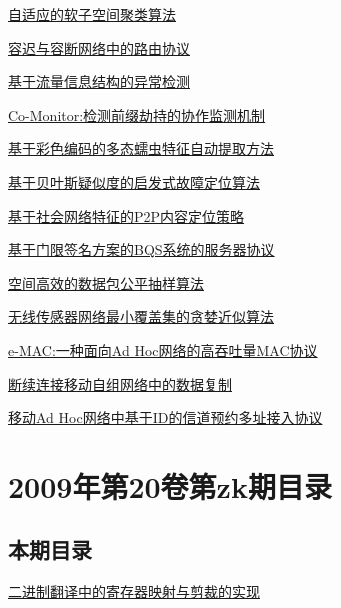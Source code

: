 \documentclass[a4paper]{article}
\begin{document}
\href{http://www.jos.org.cn/ch/reader/download_pdf.aspx?file_no=3763&year_id=2010&quarter_id=10&falg=1}{自适应的软子空间聚类算法}

\href{http://www.jos.org.cn/ch/reader/download_pdf.aspx?file_no=3774&year_id=2010&quarter_id=10&falg=1}{容迟与容断网络中的路由协议}

\href{http://www.jos.org.cn/ch/reader/download_pdf.aspx?file_no=3698&year_id=2010&quarter_id=10&falg=1}{基于流量信息结构的异常检测}

\href{http://www.jos.org.cn/ch/reader/download_pdf.aspx?file_no=3657&year_id=2010&quarter_id=10&falg=1}{Co-Monitor:检测前缀劫持的协作监测机制}

\href{http://www.jos.org.cn/ch/reader/download_pdf.aspx?file_no=3653&year_id=2010&quarter_id=10&falg=1}{基于彩色编码的多态蠕虫特征自动提取方法}

\href{http://www.jos.org.cn/ch/reader/download_pdf.aspx?file_no=3644&year_id=2010&quarter_id=10&falg=1}{基于贝叶斯疑似度的启发式故障定位算法}

\href{http://www.jos.org.cn/ch/reader/download_pdf.aspx?file_no=3647&year_id=2010&quarter_id=10&falg=1}{基于社会网络特征的P2P内容定位策略}

\href{http://www.jos.org.cn/ch/reader/download_pdf.aspx?file_no=3661&year_id=2010&quarter_id=10&falg=1}{基于门限签名方案的BQS系统的服务器协议}

\href{http://www.jos.org.cn/ch/reader/download_pdf.aspx?file_no=3667&year_id=2010&quarter_id=10&falg=1}{空间高效的数据包公平抽样算法}

\href{http://www.jos.org.cn/ch/reader/download_pdf.aspx?file_no=3670&year_id=2010&quarter_id=10&falg=1}{无线传感器网络最小覆盖集的贪婪近似算法}

\href{http://www.jos.org.cn/ch/reader/download_pdf.aspx?file_no=3674&year_id=2010&quarter_id=10&falg=1}{e-MAC:一种面向Ad Hoc网络的高吞吐量MAC协议}

\href{http://www.jos.org.cn/ch/reader/download_pdf.aspx?file_no=3642&year_id=2010&quarter_id=10&falg=1}{断续连接移动自组网络中的数据复制}

\href{http://www.jos.org.cn/ch/reader/download_pdf.aspx?file_no=3694&year_id=2010&quarter_id=10&falg=1}{移动Ad Hoc网络中基于ID的信道预约多址接入协议}


\section{\textbf{2009年第20卷第zk期目录}}
\subsection{本期目录}
\href{http://www.jos.org.cn/ch/reader/download_pdf.aspx?file_no=09001&year_id=2009&quarter_id=zk&falg=1}{二进制翻译中的寄存器映射与剪裁的实现}
\end{document}

